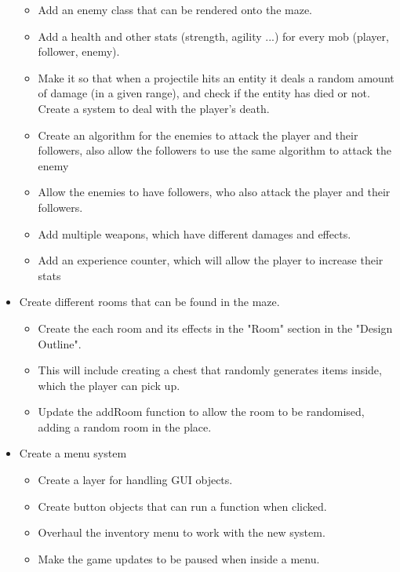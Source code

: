 \documentclass{article}
\begin{document}
\begin{itemize}
\begin{itemize}
                        \item Add an enemy class that can be rendered onto the maze.
                        \item Add a health and other stats (strength, agility ...) for every mob (player, follower, enemy).
                        \item Make it so that when a projectile hits an entity it deals a random amount of damage (in a given range), and check if the entity has died or not. Create a system to deal with the player's death.
                        \item Create an algorithm for the enemies to attack the player and their followers, also allow the followers to use the same algorithm to attack the enemy
                        \item Allow the enemies to have followers, who also attack the player and their followers.
                        \item Add multiple weapons, which have different damages and effects.
                        \item Add an experience counter, which will allow the player to increase their stats
                    \end{itemize}
                \item Create different rooms that can be found in the maze.
                    \begin{itemize}
                        \item Create the each room and its effects in the "Room" section in the "Design Outline".
                        \item This will include creating a chest that randomly generates items inside, which the player can pick up.
                        \item Update the addRoom function to allow the room to be randomised, adding a random room in the place.
                    \end{itemize}
                \item Create a menu system
                    \begin{itemize}
                        \item Create a layer for handling GUI objects.
                        \item Create button objects that can run a function when clicked.
                        \item Overhaul the inventory menu to work with the new system.
                        \item Make the game updates to be paused when inside a menu.

\end{itemize}
\end{itemize}
\end{document}

